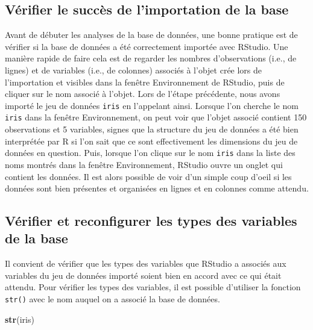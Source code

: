 \documentclass[
  french,
]{book}
\newenvironment{Shaded}{\begin{snugshade}}{\end{snugshade}}
\newcommand{\KeywordTok}[1]{\textcolor[rgb]{0.13,0.29,0.53}{\textbf{#1}}}
\newcommand{\NormalTok}[1]{#1}
\begin{document}
\hypertarget{vuxe9rifier-le-succuxe8s-de-limportation-de-la-base}{%
\subsection{Vérifier le succès de l'importation de la base}\label{vuxe9rifier-le-succuxe8s-de-limportation-de-la-base}}

Avant de débuter les analyses de la base de données, une bonne pratique est de vérifier si la base de données a été correctement importée avec RStudio. Une manière rapide de faire cela est de regarder les nombres d'observations (i.e., de lignes) et de variables (i.e., de colonnes) associés à l'objet crée lors de l'importation et visibles dans la fenêtre Environnement de RStudio, puis de cliquer sur le nom associé à l'objet. Lors de l'étape précédente, nous avons importé le jeu de données \texttt{iris} en l'appelant ainsi. Lorsque l'on cherche le nom \texttt{iris} dans la fenêtre Environnement, on peut voir que l'objet associé contient 150 observations et 5 variables, signes que la structure du jeu de données a été bien interprétée par R si l'on sait que ce sont effectivement les dimensions du jeu de données en question. Puis, lorsque l'on clique sur le nom \texttt{iris} dans la liste des noms montrés dans la fenêtre Environnement, RStudio ouvre un onglet qui contient les données. Il est alors possible de voir d'un simple coup d'oeil si les données sont bien présentes et organisées en lignes et en colonnes comme attendu.

\hypertarget{vuxe9rifier-et-reconfigurer-les-types-des-variables-de-la-base}{%
\subsection{Vérifier et reconfigurer les types des variables de la base}\label{vuxe9rifier-et-reconfigurer-les-types-des-variables-de-la-base}}

Il convient de vérifier que les types des variables que RStudio a associés aux variables du jeu de données importé soient bien en accord avec ce qui était attendu. Pour vérifier les types des variables, il est possible d'utiliser la fonction \texttt{str()} avec le nom auquel on a associé la base de données.

\begin{Shaded}
\begin{Highlighting}[]
\KeywordTok{str}\NormalTok{(iris)}
\end{Highlighting}
\end{Shaded}
\end{document}
